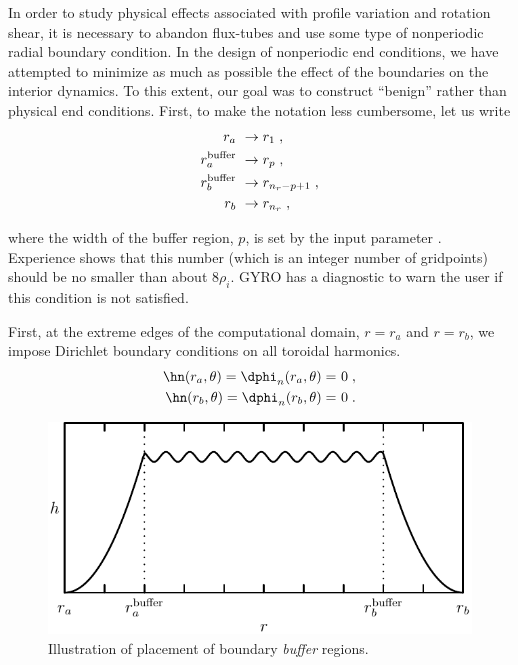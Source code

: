 In order to study physical effects associated with profile variation and 
rotation shear, it is necessary to abandon flux-tubes and use some type 
of nonperiodic radial boundary condition.  In the 
design of nonperiodic end conditions, we have attempted to 
minimize as much as possible the effect of the boundaries 
on the interior dynamics.  To this extent, our goal was 
to construct ``benign'' rather than physical end conditions.
First, to make the notation less cumbersome, let us write
%
\begin{align}
r_a &~\rightarrow r_1 \; , \\
r_a^{\rm buffer} &~\rightarrow r_p \; , \\
r_b^{\rm buffer} &~\rightarrow r_{n_r-p+1} \; , \\
r_b &~\rightarrow r_{n_r} \; , 
\end{align}

\noindent
where the width of the buffer region, $p$, is set by the input 
parameter .  Experience shows that this 
number (which is an integer number of gridpoints) should be no smaller 
than about $8\rho_i$.  GYRO has a diagnostic to warn the user if 
this condition is not satisfied.

First, at the extreme edges of the computational domain, $r=r_a$ 
and $r=r_b$, we impose Dirichlet boundary conditions on all 
toroidal harmonics.
%
\begin{align}
\hn(r_a,\theta) = \dphi_n(r_a,\theta) = &~0 \; , \\
\hn(r_b,\theta) = \dphi_n(r_b,\theta) = &~0 \; .
\end{align}

\begin{figure}
\begin{center}
\includegraphics[scale=1.0]{figures/boundary.pdf}
\caption{Illustration of placement of boundary {\it buffer} regions.}
\label{fig.boundary}
\end{center}
\end{figure}

